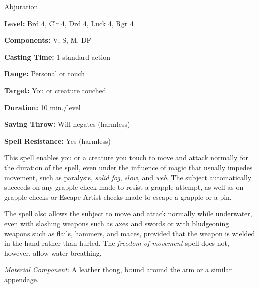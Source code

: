 
Abjuration

\textbf{Level:} Brd 4, Clr 4, Drd 4, Luck 4, Rgr 4

\textbf{Components:} V, S, M, DF

\textbf{Casting Time:} 1 standard action

\textbf{Range:} Personal or touch

\textbf{Target:} You or creature touched

\textbf{Duration:} 10 min./level

\textbf{Saving Throw:} Will negates (harmless)

\textbf{Spell Resistance:} Yes (harmless)

This spell enables you or a creature you touch to move and attack normally for 
the duration of the spell, even under the influence of magic that usually impedes 
movement, such as paralysis, \textit{solid fog}, \textit{slow}, and \textit{web}. 
The subject automatically succeeds on any grapple check made to resist a grapple 
attempt, as well as on grapple checks or Escape Artist checks made to escape a 
grapple or a pin.

The spell also allows the subject to move and attack normally while underwater, 
even with slashing weapons such as axes and swords or with bludgeoning weapons 
such as flails, hammers, and maces, provided that the weapon is wielded in the 
hand rather than hurled. The \textit{freedom of movement} spell does not, however, 
allow water breathing.

\textit{Material Component:} A leather thong, bound around the arm or a similar 
appendage.

